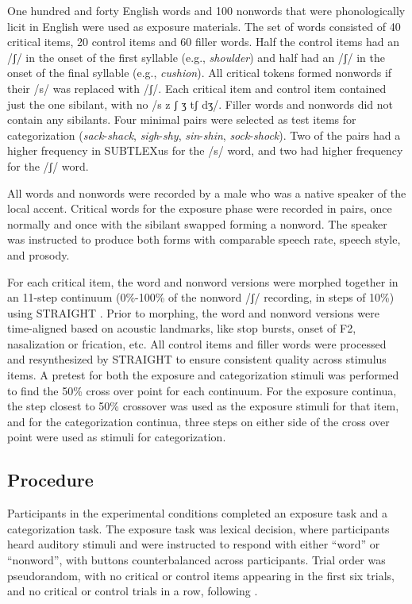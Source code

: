 \documentclass[a4paper,11pt,twocolumn]{article}
\begin{document}
One hundred and forty English words and 100 nonwords that were phonologically licit in English were used as exposure materials.  The set of words consisted of 40 critical items, 20 control items and 60 filler words.  Half the control items had an /ʃ/ in the onset of the first syllable (e.g., \emph{shoulder}) and half had an /ʃ/ in the onset of the final syllable (e.g., \emph{cushion}).  All critical tokens formed nonwords if their /s/ was replaced with /ʃ/.  Each critical item and control item contained just the one sibilant, with no /s z ʃ ʒ tʃ dʒ/.  Filler words and nonwords did not contain any sibilants. Four minimal pairs were selected as test items for categorization (\emph{sack}-\emph{shack}, \emph{sigh}-\emph{shy}, \emph{sin}-\emph{shin}, \emph{sock}-\emph{shock}).  Two of the pairs had a higher frequency in SUBTLEXus \cite{Brysbaert2009} for the /s/ word, and two had higher frequency for the /ʃ/ word.

All words and nonwords were recorded by a male who was a native speaker of the local accent. Critical words for the exposure phase were recorded in pairs, once normally and once with the sibilant swapped forming a nonword.  The speaker was instructed to produce both forms with comparable speech rate, speech style, and prosody.

For each critical item, the word and nonword versions were morphed together in an 11-step continuum (0\%-100\% of the nonword /ʃ/ recording, in steps of 10\%) using STRAIGHT \cite{Kawahara2008}.  Prior to morphing, the word and nonword versions were time-aligned based on acoustic landmarks, like stop bursts, onset of F2, nasalization or frication, etc.  All control items and filler words were processed and resynthesized by STRAIGHT to ensure consistent quality across stimulus items.  A pretest for both the exposure and categorization stimuli was performed to find the 50\% cross over point for each continuum.  For the exposure continua, the step closest to 50\% crossover was used as the exposure stimuli for that item, and for the categorization continua, three steps on either side of the cross over point were used as stimuli for categorization.

\subsection{Procedure}
Participants in the experimental conditions completed an exposure task and a categorization task.  The exposure task was lexical decision, where participants heard auditory stimuli and were instructed to respond with either ``word'' or ``nonword'', with buttons counterbalanced across participants. Trial order was pseudorandom, with no critical or control items appearing in the first six trials, and no critical or control trials in a row, following \cite{Reinisch2013}.
\end{document}
